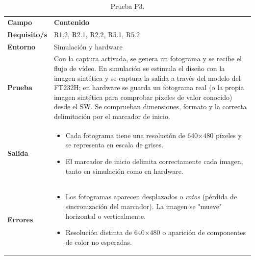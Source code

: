 \documentclass[../main.tex]{subfiles}
\begin{document}
\begin{table}[H]
\centering
\caption{Prueba P3.}
\label{tab:prueba_p3}
\begin{tabular}{>{\raggedright\arraybackslash}p{2.5cm}>{\raggedright\arraybackslash}p{11cm}}
\rowcolor[HTML]{156082}
{\color{white}\textbf{Campo}} & {\color{white}\textbf{Contenido}} \\
\rowcolor[HTML]{C0E6F5}
\textbf{Requisito/s} & R1.2, R2.1, R2.2, R5.1, R5.2 \\
\textbf{Entorno} & Simulación y hardware \\
\rowcolor[HTML]{C0E6F5}
\textbf{Prueba} & Con la captura activada, se genera un fotograma y se recibe el flujo de vídeo. En simulación se estimula el diseño con la imagen sintética y se captura la salida a través del modelo del FT232H; en hardware se guarda un fotograma real (o la propia imagen sintética para comprobar pixeles de valor conocido) desde el \ac{SW}. Se comprueban dimensiones, formato y la correcta delimitación por el marcador de inicio. \\
\textbf{Salida} & \begin{itemize}\setlength{\itemsep}{0pt}
    \item Cada fotograma tiene una resolución de 640$\times$480 píxeles y se representa en escala de grises.
    \item El marcador de inicio delimita correctamente cada imagen, tanto en simulación como en hardware.
\end{itemize} \\
\rowcolor[HTML]{C0E6F5}
\textbf{Errores} & \begin{itemize}\setlength{\itemsep}{0pt}
    \item Los fotogramas aparecen desplazados o \emph{rotos} (pérdida de sincronización del marcador). La imagen se "mueve" horizontal o verticalmente.
    \item Resolución distinta de 640$\times$480 o aparición de componentes de color no esperadas.
\end{itemize} \\
\end{tabular}
\end{table}
\end{document}
